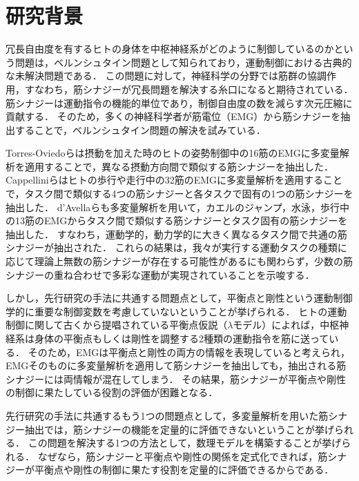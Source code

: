 \section{研究背景}
冗長自由度を有するヒトの身体を中枢神経系がどのように制御しているのかという問題は，ベルンシュタイン問題として知られており\cite{Bernstein1967}，運動制御における古典的な未解決問題である．
この問題に対して，神経科学の分野では筋群の協調作用，すなわち，筋シナジーが冗長問題を解決する糸口になると期待されている．
筋シナジーは運動指令の機能的単位であり，制御自由度の数を減らす次元圧縮に貢献する．
そのため，多くの神経科学者が筋電位（EMG）から筋シナジーを抽出することで，ベルンシュタイン問題の解決を試みている\cite{Torres-Oviedo2007,Cappellini2006,d'Avella2005,Ivanenko2004,Ting2005,Ivanenko2006,Bizzi2008}．

Torres-Oviedoらは摂動を加えた時のヒトの姿勢制御中の16筋のEMGに多変量解析を適用することで，異なる摂動方向間で類似する筋シナジーを抽出した\cite{Torres-Oviedo2007}．
Cappelliniらはヒトの歩行や走行中の32筋のEMGに多変量解析を適用することで，タスク間で類似する4つの筋シナジーと各タスクで固有の1つの筋シナジーを抽出した\cite{Cappellini2006}．
d'Avellaらも多変量解析を用いて，カエルのジャンプ，水泳，歩行中の13筋のEMGからタスク間で類似する筋シナジーとタスク固有の筋シナジーを抽出した\cite{d'Avella2005}．
すなわち，運動学的，動力学的に大きく異なるタスク間で共通の筋シナジーが抽出された．
これらの結果は，我々が実行する運動タスクの種類に応じて理論上無数の筋シナジーが存在する可能性があるにも関わらず，少数の筋シナジーの重ね合わせで多彩な運動が実現されていることを示唆する．

しかし，先行研究の手法に共通する問題点として，平衡点と剛性という運動制御学的に重要な制御変数を考慮していないということが挙げられる．
ヒトの運動制御に関して古くから提唱されている平衡点仮説（$\lambda$モデル）によれば，中枢神経系は身体の平衡点もしくは剛性を調整する2種類の運動指令を筋に送っている\cite{Feldman2008}．
そのため，EMGは平衡点と剛性の両方の情報を表現していると考えられ，EMGそのものに多変量解析を適用して筋シナジーを抽出しても，抽出される筋シナジーには両情報が混在してしまう．
その結果，筋シナジーが平衡点や剛性の制御に果たしている役割の評価が困難となる．

先行研究の手法に共通するもう1つの問題点として，多変量解析を用いた筋シナジー抽出では，筋シナジーの機能を定量的に評価できないということが挙げられる．
この問題を解決する1つの方法として，数理モデルを構築することが挙げられる．
なぜなら，筋シナジーと平衡点や剛性の関係を定式化できれば，筋シナジーが平衡点や剛性の制御に果たす役割を定量的に評価できるからである．

